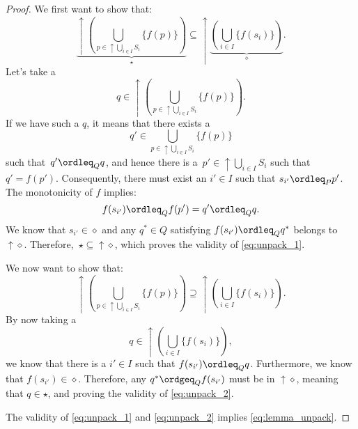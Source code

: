 \begin{proof}
    We first want to show that:
    \begin{equation}
        \label{eq:unpack_1}
        \underbrace{\uparrow \left(\bigcup_{p\in \uparrow \bigcup_{i\in I}S_i}\{f(p)\} \right)}_{\star}\subseteq \uparrow \underbrace{\left( \bigcup_{i\in I}\{f(s_i)\}\right)}_{\diamond}.
    \end{equation}
    Let's take a
    \begin{equation}
        q\in \uparrow\left( \bigcup_{p\in \uparrow \bigcup_{i\in I}S_i}\{f(p)\}\right).
    \end{equation}
    If we have such a $q$, it means that there exists a
    \begin{equation}
        q'\in \bigcup_{p\in \uparrow\bigcup_{i\in I}S_i}\{f(p)\}
    \end{equation}
    such that~$q'\ordleq_Q q$, and hence there is a~$p'\in \uparrow \bigcup_{i\in I} S_i$ such that $q'=f(p')$. Consequently, there must exist an $i'\in I$ such that $s_{i'}\ordleq_P p'$. The monotonicity of $f$ implies:
    \begin{equation}
        f(s_{i'})\ordleq_Q f(p')=q'\ordleq_Q q.
    \end{equation}
    We know that $s_{i'}\in \diamond$ and any $q^*\in Q$ satisfying $f(s_{i'})\ordleq_Q q^*$ belongs to $\uparrow \diamond$. Therefore,~$\star\subseteq \uparrow \diamond$, which proves the validity of \cref{eq:unpack_1}.

    We now want to show that:
    \begin{equation}
        \label{eq:unpack_2}
        \uparrow \left(\bigcup_{p\in \uparrow \bigcup_{i\in I}S_i}\{f(p)\} \right)\supseteq \uparrow \left( \bigcup_{i\in I}\{f(s_i)\}\right).
    \end{equation}
    By now taking a
    \begin{equation}
        q\in \uparrow \left( \bigcup_{i\in I}\{f(s_i)\}\right),
    \end{equation}
    we know that there is a $i'\in I$ such that $f(s_{i'})\ordleq_Q q$. Furthermore, we know that $f(s_{i'})\in \diamond$. Therefore, any $q^*\ordgeq_Q f(s_{i'})$ must be in $\uparrow \diamond$, meaning that $q\in \star$, and proving the validity of \cref{eq:unpack_2}.

    The validity of \cref{eq:unpack_1} and \cref{eq:unpack_2} implies \cref{eq:lemma_unpack}.
\end{proof}

